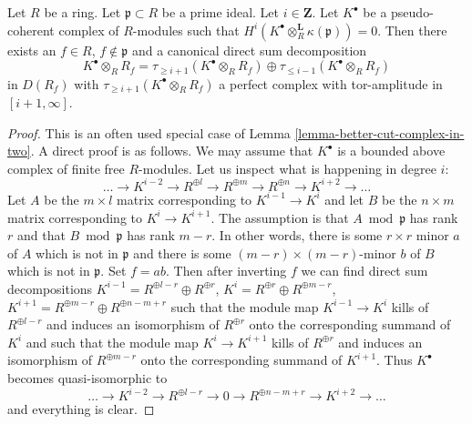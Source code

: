 \begin{lemma}
\label{lemma-cut-complex-in-two}
Let $R$ be a ring. Let $\mathfrak p \subset R$ be a prime ideal.
Let $i \in \mathbf{Z}$. Let $K^\bullet$ be a pseudo-coherent complex
of $R$-modules such that
$H^i(K^\bullet \otimes_R^{\mathbf{L}} \kappa(\mathfrak p)) = 0$.
Then there exists an $f \in R$, $f \not \in \mathfrak p$
and a canonical direct sum decomposition
$$
K^\bullet \otimes_R R_f =
\tau_{\geq i + 1}(K^\bullet \otimes_R R_f) \oplus
\tau_{\leq i - 1}(K^\bullet \otimes_R R_f)
$$
in $D(R_f)$ with $\tau_{\geq i + 1}(K^\bullet \otimes_R R_f)$ a perfect
complex with tor-amplitude in $[i + 1, \infty]$.
\end{lemma}

\begin{proof}
This is an often used special case of
Lemma \ref{lemma-better-cut-complex-in-two}.
A direct proof is as follows.
We may assume that $K^\bullet$ is a bounded above
complex of finite free $R$-modules. Let us inspect what is happening
in degree $i$:
$$
\ldots \to K^{i - 2} \to R^{\oplus l}
\to R^{\oplus m} \to R^{\oplus n} \to K^{i + 2} \to \ldots
$$
Let $A$ be the $m \times l$ matrix corresponding to $K^{i - 1} \to K^i$
and let $B$ be the $n \times m$ matrix corresponding to $K^i \to K^{i + 1}$.
The assumption is that $A \bmod \mathfrak p$ has rank $r$ and that
$B \bmod \mathfrak p$ has rank $m - r$. In other words, there is some
$r \times r$ minor $a$ of $A$ which is not in $\mathfrak p$ and there is
some $(m - r) \times (m - r)$-minor $b$ of $B$ which is not in $\mathfrak p$.
Set $f = ab$. Then after inverting $f$ we can find direct sum decompositions
$K^{i - 1} = R^{\oplus l - r} \oplus R^{\oplus r}$,
$K^i = R^{\oplus r} \oplus R^{\oplus m - r}$,
$K^{i + 1} = R^{\oplus m - r} \oplus R^{\oplus n - m + r}$
such that the module map $K^{i - 1} \to K^i$ kills of
$R^{\oplus l - r}$ and induces an isomorphism of $R^{\oplus r}$ onto the
corresponding summand of $K^i$ and such that the module map $K^i \to K^{i + 1}$
kills of $R^{\oplus r}$ and induces an isomorphism of $R^{\oplus m - r}$
onto the corresponding summand of $K^{i + 1}$. Thus $K^\bullet$ becomes
quasi-isomorphic to
$$
\ldots \to K^{i - 2} \to R^{\oplus l - r}
\to 0 \to R^{\oplus n - m + r} \to K^{i + 2} \to \ldots
$$
and everything is clear.
\end{proof}
